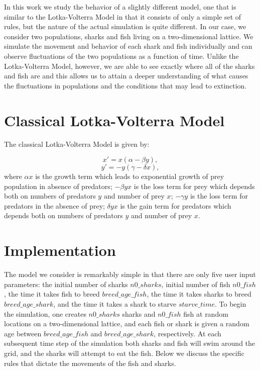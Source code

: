 \documentclass[aps,prl,preprint,superscriptaddress]{revtex4}
\begin{document}
In this work we study the behavior of a slightly different model, one that  is similar to the Lotka-Volterra Model in that it consists of only a simple set of rules, but the nature of the actual simulation is quite different. In our case, we consider two populations, sharks and fish living on a two-dimensional lattice. We simulate the movement and behavior of each shark and fish individually and can observe fluctuations of the two populations as a function of time. Unlike the Lotka-Volterra Model, however, we are able to see exactly where all of the sharks and fish are and this allows us to attain a deeper understanding of what causes the fluctuations in populations and the conditions that may lead to extinction. 


\section{Classical Lotka-Volterra Model}	
The classical Lotka-Volterra Model is given by:

\begin{equation}
x' = x(\alpha-\beta y),
\end{equation}
\begin{equation}
y' = -y(\gamma -\delta x),
\end{equation}
where $\alpha x$ is the growth term which leads to exponential growth of prey population in absence of predators; $-\beta yx$ is the loss term for prey which depends both on numbers of predators $y$ and number of prey $x$; $-\gamma y$ is the loss term for predators in the absence of prey; $\delta yx$ is the gain term for predators which depends both on numbers of predators $y$ and number of prey $x$. 

\pagebreak
\section{Implementation}

The model we consider is remarkably simple in that there are only five user input parameters: the initial number of sharks $n0\_sharks$, initial number of fish $n0\_fish$, the time it takes fish to breed $breed\_age\_fish$, the time it takes sharks to breed $breed\_age\_shark$, and the time it takes a shark to starve $starve\_time$. To begin the simulation, one creates $n0\_sharks$ sharks and $n0\_fish$ fish at random locations on a two-dimensional lattice, and each fish or shark is given a random age between $breed\_age\_fish$ and $breed\_age\_shark$, respectively. At each subsequent time step of the simulation both sharks and fish will swim around the grid, and the sharks will attempt to eat the fish. Below we discuss the specific rules that dictate the movements of the fish and sharks.
\end{document}
